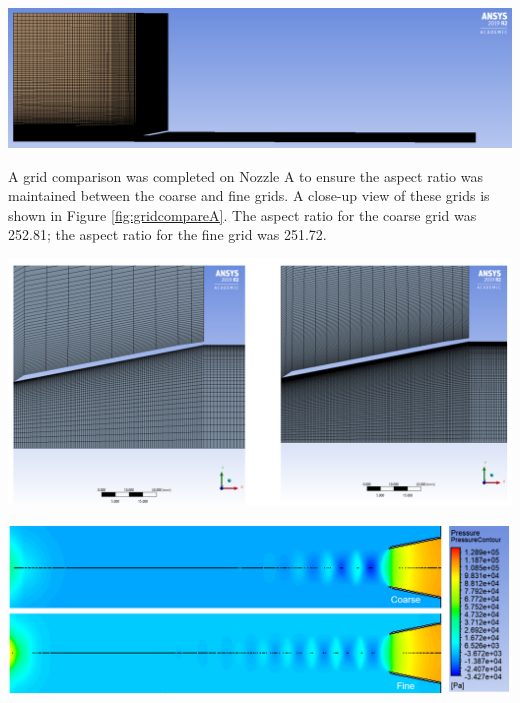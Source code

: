 \documentclass[12pt]{article} %
\begin{document}
\begin{center}
    \includegraphics[width = \linewidth]{NozzleC_Mesh.PNG}
    \label{fig:geomC}
\end{center}

A grid comparison was completed on Nozzle A to ensure the aspect ratio was maintained between the coarse and fine grids. A close-up view of these grids is shown in Figure \ref{fig:gridcompareA}. The aspect ratio for the coarse grid was 252.81; the aspect ratio for the fine grid was 251.72.

\begin{center}
    \includegraphics[width = \linewidth]{GridCompareA.png}
    \label{fig:gridcompareA}
\end{center}

\begin{center}
    \includegraphics[width = \linewidth]{GridCompareA_Pressure.PNG}
    \label{fig:gridcompareA_Pressure}
\end{center}
\end{document}
